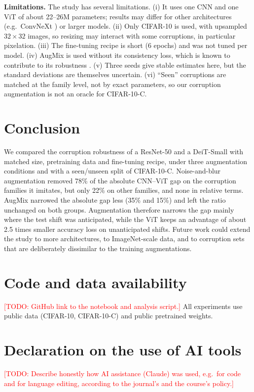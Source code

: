 \documentclass[a4paper,11pt]{article}
\newcommand{\todo}[1]{\textcolor{red}{[TODO: #1]}}
\begin{document}
\textbf{Limitations.} The study has several limitations. (i) It uses one CNN and one ViT of about 22--26M parameters; results may differ for other architectures (e.g.\ ConvNeXt \cite{liu2022convnet}) or larger models. (ii) Only CIFAR-10 is used, with upsampled $32\times32$ images, so resizing may interact with some corruptions, in particular pixelation. (iii) The fine-tuning recipe is short (6 epochs) and was not tuned per model. (iv) AugMix is used without its consistency loss, which is known to contribute to its robustness \cite{hendrycks2020augmix}. (v) Three seeds give stable estimates here, but the standard deviations are themselves uncertain. (vi) ``Seen'' corruptions are matched at the family level, not by exact parameters, so our corruption augmentation is not an oracle for CIFAR-10-C.

\section{Conclusion}
\label{sec:conclusion}

We compared the corruption robustness of a ResNet-50 and a DeiT-Small with matched size, pretraining data and fine-tuning recipe, under three augmentation conditions and with a seen/unseen split of CIFAR-10-C. Noise-and-blur augmentation removed 78\% of the absolute CNN--ViT gap on the corruption families it imitates, but only 22\% on other families, and none in relative terms. AugMix narrowed the absolute gap less (35\% and 15\%) and left the ratio unchanged on both groups. Augmentation therefore narrows the gap mainly where the test shift was anticipated, while the ViT keeps an advantage of about 2.5 times smaller accuracy loss on unanticipated shifts. Future work could extend the study to more architectures, to ImageNet-scale data, and to corruption sets that are deliberately dissimilar to the training augmentations.

\section*{Code and data availability}
\todo{GitHub link to the notebook and analysis script.} All experiments use public data (CIFAR-10, CIFAR-10-C) and public pretrained weights.

\section*{Declaration on the use of AI tools}
\todo{Describe honestly how AI assistance (Claude) was used, e.g.\ for code and for language editing, according to the journal's and the course's policy.}
\end{document}
